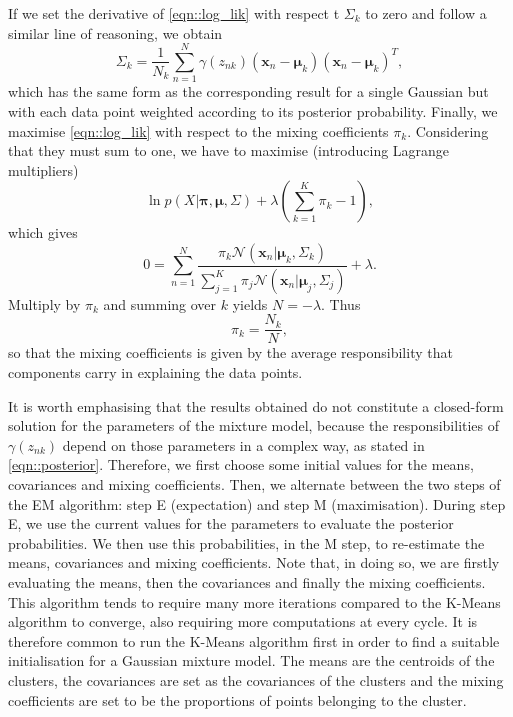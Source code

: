 \documentclass[a4paper]{article}
\begin{document}
 	If we set the derivative of \eqref{eqn::log_lik} with respect t $\Sigma_{k}$ to zero and follow a similar line of reasoning, we obtain
 	\begin{equation*}
 	\Sigma_{k} = \frac{1}{N_{k}} \sum_{n=1}^{N} \gamma \left( z_{nk} \right) \left( \boldsymbol{x}_{n} - \boldsymbol{\mu}_{k} \right) \left( \boldsymbol{x}_{n} - \boldsymbol{\mu}_{k} \right)^{T},
 	\end{equation*}
 	which has the same form as the corresponding result for a single Gaussian but with each data point weighted according to its posterior probability.
 	Finally, we maximise \eqref{eqn::log_lik} with respect to the mixing coefficients $\pi_{k}$. Considering that they must sum to one, we have to maximise (introducing Lagrange multipliers)
 	\begin{equation*}
 	\ln p \left( X | \boldsymbol{\pi}, \boldsymbol{\mu}, \Sigma  \right) +
 	\lambda \left( \sum_{k=1}^{K} \pi_{k} - 1 \right),
 	\end{equation*}
 	which gives
 	\begin{equation*}
 	0 = \sum_{n=1}^{N} \frac{ \pi_{k}  \mathcal{N} \left( \boldsymbol{x}_{n} | \boldsymbol{\mu}_{k}, \Sigma_{k} \right)}{\sum_{j=1}^{K} \pi_{j} \mathcal{N} \left( \boldsymbol{x}_{n} | \boldsymbol{\mu}_{j}, \Sigma_{j} \right)} + \lambda.
 	\end{equation*}
 	Multiply by $\pi_{k}$ and summing over $k$ yields $N = - \lambda$. Thus
 	\begin{equation*}
 	\pi_{k} = \frac{N_{k}}{N},
 	\end{equation*}
 	so that the mixing coefficients is given by the average responsibility that components carry in explaining the data points.

 	It is worth emphasising that the results obtained do not constitute a closed-form solution for the parameters of the mixture model, because the responsibilities of $\gamma \left( z_{nk} \right)$ depend on those parameters in a complex way, as stated in \eqref{eqn::posterior}.
 	Therefore, we first choose some initial values for the means, covariances and mixing coefficients. Then, we alternate between the two steps of the EM algorithm: step E (expectation) and step M (maximisation).
 	During step E, we use the current values for the parameters to evaluate the posterior probabilities. We then use this probabilities, in the M step, to re-estimate the means, covariances and mixing coefficients.
 	Note that, in doing so, we are firstly evaluating the means, then the covariances and finally the mixing coefficients.
 	This algorithm tends to require many more iterations compared to the K-Means algorithm to converge, also requiring more computations at every cycle. It is therefore common to run the K-Means algorithm first in order to find a suitable initialisation for a Gaussian mixture model.
 	The means are the centroids of the clusters, the covariances are set as the covariances of the clusters and the mixing coefficients are set to be the proportions of points belonging to the cluster.
 	
\end{document}
